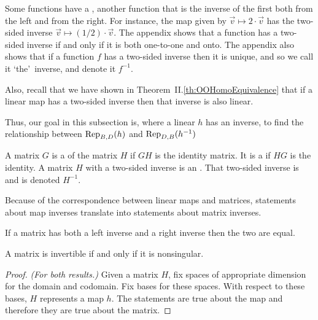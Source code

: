 Some functions have a 
, 
another function
that is the inverse of the first both from the left and from the right.
For instance, the map given by 
$\vec{v}\mapsto 2\cdot \vec{v}$ has the two-sided inverse 
$\vec{v}\mapsto (1/2)\cdot\vec{v}$.  
% 
The appendix shows that a function
has a two-sided inverse if and only if it is both one-to-one and onto.
The appendix also shows that if a function $f$ has a two-sided inverse then 
it is unique, and so we call it 
`the'~inverse,
and denote it $f^{-1}$.

Also, recall that we have shown in Theorem~II.\ref{th:OOHomoEquivalence}
that if a linear map has a two-sided inverse
then that inverse is also linear. 

Thus, our goal in this subsection is, where a linear $h$ has an inverse,
to find the relationship between $\rep{h}{B,D}$ and $\rep{h^{-1}}{D,B}$

\begin{definition}
A matrix \( G \) is a 
of the matrix \( H \) if \( GH \) is the identity matrix.
It is a 
if \( HG \) is the identity.
A matrix $H$ with a two-sided inverse is an .
That two-sided inverse is
 and
is denoted \( H^{-1} \).
\end{definition}

Because of the correspondence between linear maps and matrices,
statements about map inverses translate into statements about matrix inverses.

\begin{lemma}     \label{le:LeftAndRightInvEqual}
If a matrix has both a left inverse and a right inverse then the two are equal.
\end{lemma}

\begin{theorem}
A matrix is invertible if and only if it is nonsingular.
\end{theorem}

\begin{proof}
\textit{(For both results.)}
Given a matrix $H$, fix spaces of appropriate dimension for the domain
and codomain.
Fix bases for these spaces.
With respect to these bases, $H$ represents a map $h$.
The statements are true about the map and therefore they are true about the
matrix.
\end{proof}

